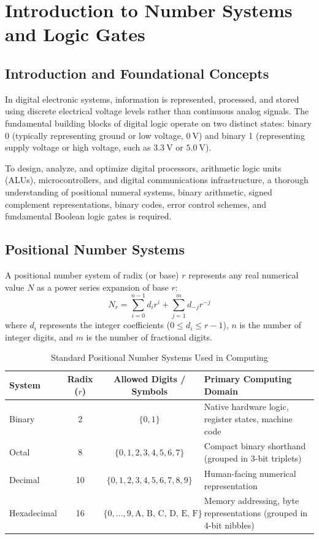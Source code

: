 \chapter{Introduction to Number Systems and Logic Gates}
\label{chap:number-systems-logic}

\section{Introduction and Foundational Concepts}
In digital electronic systems, information is represented, processed, and stored using discrete electrical voltage levels rather than continuous analog signals. The fundamental building blocks of digital logic operate on two distinct states: binary 0 (typically representing ground or low voltage, $\SI{0}{\volt}$) and binary 1 (representing supply voltage or high voltage, such as $\SI{3.3}{\volt}$ or $\SI{5.0}{\volt}$).

To design, analyze, and optimize digital processors, arithmetic logic units (ALUs), microcontrollers, and digital communications infrastructure, a thorough understanding of positional numeral systems, binary arithmetic, signed complement representations, binary codes, error control schemes, and fundamental Boolean logic gates is required.

\section{Positional Number Systems}
A positional number system of radix (or base) $r$ represents any real numerical value $N$ as a power series expansion of base $r$:
\begin{equation}
N_r = \sum_{i=0}^{n-1} d_i r^i + \sum_{j=1}^{m} d_{-j} r^{-j}
\end{equation}
where $d_i$ represents the integer coefficients ($0 \le d_i \le r-1$), $n$ is the number of integer digits, and $m$ is the number of fractional digits.

\begin{table}[htbp]
\centering
\caption{Standard Positional Number Systems Used in Computing}
\label{tab:number-systems}
\begin{tabularx}{\textwidth}{l c c X}
\toprule
\textbf{System} & \textbf{Radix ($r$)} & \textbf{Allowed Digits / Symbols} & \textbf{Primary Computing Domain} \\
\midrule
Binary & 2 & $\{0, 1\}$ & Native hardware logic, register states, machine code \\
Octal & 8 & $\{0, 1, 2, 3, 4, 5, 6, 7\}$ & Compact binary shorthand (grouped in 3-bit triplets) \\
Decimal & 10 & $\{0, 1, 2, 3, 4, 5, 6, 7, 8, 9\}$ & Human-facing numerical representation \\
Hexadecimal & 16 & $\{0, \dots, 9, \text{A, B, C, D, E, F}\}$ & Memory addressing, byte representations (grouped in 4-bit nibbles) \\
\bottomrule
\end{tabularx}
\end{table}

